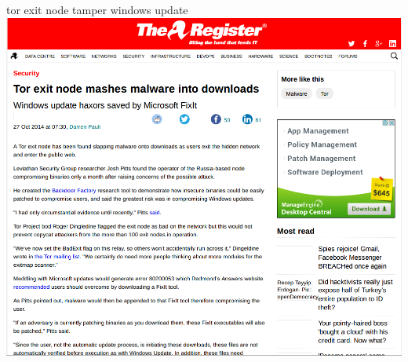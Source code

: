 \documentclass[11pt]{beamer}
\begin{document}
\begin{frame}{tor exit node tamper windows update}
\includegraphics[scale=0.3]{tor_exit_windows_update.png}
\end{frame}
\end{document}
